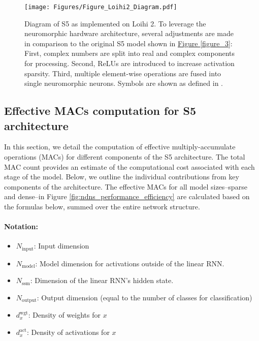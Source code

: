 
\begin{figure*}[ht!]
    \centering
    \texttt{[image: Figures/Figure\_Loihi2\_Diagram.pdf]}
    \caption{Diagram of S5 as implemented on Loihi 2. To leverage the neuromorphic hardware architecture, several adjustments are made in comparison to the original S5 model shown in \hyperref[figure_3]{Figure \ref{figure_3}}: First, complex numbers are split into real and complex components for processing. Second, ReLUs are introduced to increase activation sparsity. Third, multiple element-wise operations are fused into single neuromorphic neurons. Symbols are shown as defined in .}%
    \label{fig:loihi-implementation}
\end{figure*}


\subsection{Effective MACs computation for S5 architecture}
\label{supp:macs}

In this section, we detail the computation of effective multiply-accumulate operations (MACs) for different components of the S5 architecture. The total MAC count provides an estimate of the computational cost associated with each stage of the model. 
Below, we outline the individual contributions from key components of the architecture. The effective MACs for all model sizes--sparse and dense--in Figure \autoref{fig:ndns_performance_efficiency} are calculated based on the formulas below, summed over the entire network structure.

\paragraph{Notation:}
\begin{itemize}
    \item $N_\text{input}$: Input dimension
    \item $N_\text{model}$: Model dimension for activations outside of the linear RNN. 
    \item $N_\text{ssm}$: Dimension of the linear RNN's hidden state. 
    \item $N_\text{output}$: Output dimension (equal to the number of classes for classification)
    \item $d^\text{wgt}_x$: Density of weights for $x$
    \item $d^\text{act}_x$: Density of activations for $x$
\end{itemize}

